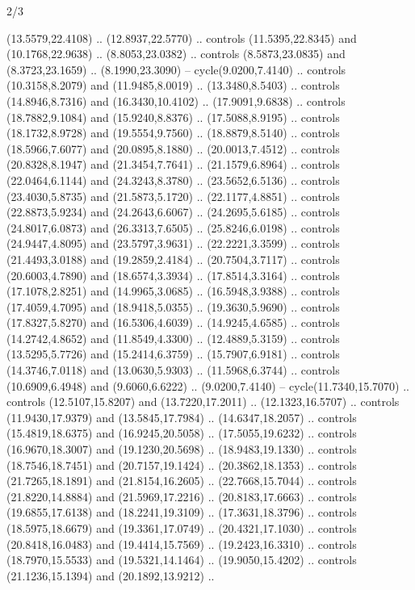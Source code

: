 \begin{flagdescription}{2/3}
\begin{scope}[yshift=\flagwidth,scale=\flagwidth/1241.93737]
\begin{scope}[y=-1mm, x=1mm,draw=gold,fill=blue,line join=miter,miter limit=4,line width=1.8\lw]
\begin{scope}[y=1mm, x=1mm, yscale=-1,shift={(573.68mm+\str,145.75)}]
\begin{scope}[scale=1.35,shift={(-9,-3)}]
\begin{scope}[scale=0.55]
\begin{scope}[scale=1.333]
    (13.5579,22.4108) .. (12.8937,22.5770) .. controls (11.5395,22.8345) and
    (10.1768,22.9638) .. (8.8053,23.0382) .. controls (8.5873,23.0835) and
    (8.3723,23.1659) .. (8.1990,23.3090) -- cycle(9.0200,7.4140) .. controls
    (10.3158,8.2079) and (11.9485,8.0019) .. (13.3480,8.5403) .. controls
    (14.8946,8.7316) and (16.3430,10.4102) .. (17.9091,9.6838) .. controls
    (18.7882,9.1084) and (15.9240,8.8376) .. (17.5088,8.9195) .. controls
    (18.1732,8.9728) and (19.5554,9.7560) .. (18.8879,8.5140) .. controls
    (18.5966,7.6077) and (20.0895,8.1880) .. (20.0013,7.4512) .. controls
    (20.8328,8.1947) and (21.3454,7.7641) .. (21.1579,6.8964) .. controls
    (22.0464,6.1144) and (24.3243,8.3780) .. (23.5652,6.5136) .. controls
    (23.4030,5.8735) and (21.5873,5.1720) .. (22.1177,4.8851) .. controls
    (22.8873,5.9234) and (24.2643,6.6067) .. (24.2695,5.6185) .. controls
    (24.8017,6.0873) and (26.3313,7.6505) .. (25.8246,6.0198) .. controls
    (24.9447,4.8095) and (23.5797,3.9631) .. (22.2221,3.3599) .. controls
    (21.4493,3.0188) and (19.2859,2.4184) .. (20.7504,3.7117) .. controls
    (20.6003,4.7890) and (18.6574,3.3934) .. (17.8514,3.3164) .. controls
    (17.1078,2.8251) and (14.9965,3.0685) .. (16.5948,3.9388) .. controls
    (17.4059,4.7095) and (18.9418,5.0355) .. (19.3630,5.9690) .. controls
    (17.8327,5.8270) and (16.5306,4.6039) .. (14.9245,4.6585) .. controls
    (14.2742,4.8652) and (11.8549,4.3300) .. (12.4889,5.3159) .. controls
    (13.5295,5.7726) and (15.2414,6.3759) .. (15.7907,6.9181) .. controls
    (14.3746,7.0118) and (13.0630,5.9303) .. (11.5968,6.3744) .. controls
    (10.6909,6.4948) and (9.6060,6.6222) .. (9.0200,7.4140) --
    cycle(11.7340,15.7070) .. controls (12.5107,15.8207) and (13.7220,17.2011) ..
    (12.1323,16.5707) .. controls (11.9430,17.9379) and (13.5845,17.7984) ..
    (14.6347,18.2057) .. controls (15.4819,18.6375) and (16.9245,20.5058) ..
    (17.5055,19.6232) .. controls (16.9670,18.3007) and (19.1230,20.5698) ..
    (18.9483,19.1330) .. controls (18.7546,18.7451) and (20.7157,19.1424) ..
    (20.3862,18.1353) .. controls (21.7265,18.1891) and (21.8154,16.2605) ..
    (22.7668,15.7044) .. controls (21.8220,14.8884) and (21.5969,17.2216) ..
    (20.8183,17.6663) .. controls (19.6855,17.6138) and (18.2241,19.3109) ..
    (17.3631,18.3796) .. controls (18.5975,18.6679) and (19.3361,17.0749) ..
    (20.4321,17.1030) .. controls (20.8418,16.0483) and (19.4414,15.7569) ..
    (19.2423,16.3310) .. controls (18.7970,15.5533) and (19.5321,14.1464) ..
    (19.9050,15.4202) .. controls (21.1236,15.1394) and (20.1892,13.9212) ..

\end{scope}
\end{scope}
\end{scope}
\end{scope}
\end{scope}
\end{scope}
\end{flagdescription}
